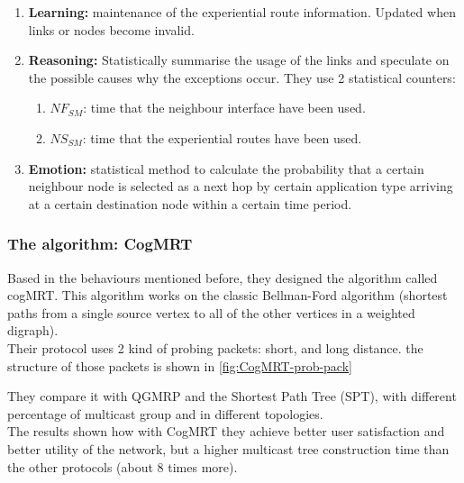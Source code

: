 \begin{enumerate}
\item \textbf{Learning:} maintenance of the experiential route information. Updated when links or nodes become invalid.

\item \textbf{Reasoning:} Statistically summarise the usage of the links and speculate on the possible causes why the exceptions occur. They use 2 statistical counters:
	\begin{enumerate}
	\item $NF_{SM}$: time that the neighbour interface have been used.
	\item $NS_{SM}$: time that the experiential routes have been used.
	\end{enumerate}

\item \textbf{Emotion:} statistical method to calculate the probability that a certain neighbour node is selected as a next hop by certain application type arriving at a certain destination node within a certain time period.
\end{enumerate}

\subsubsection{The algorithm: CogMRT}

Based in the behaviours mentioned before, they designed the algorithm called cogMRT. This algorithm works on the classic Bellman-Ford algorithm (shortest paths from a single source vertex to all of the other vertices in a weighted digraph).\\

Their protocol uses 2 kind of probing packets: short, and long distance. the structure of those packets is shown in \ref{fig:CogMRT-prob-pack}\\ 


They compare it with QGMRP \cite{QGMRP} and the Shortest Path Tree (SPT), with different percentage of multicast group and in different topologies.\\

The results shown how with CogMRT they achieve better user satisfaction and better utility of the network, but a higher multicast tree construction time than the other protocols (about 8 times more).\\

